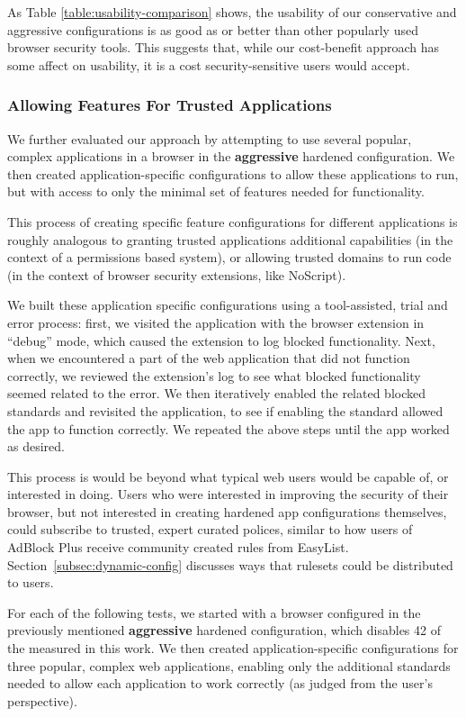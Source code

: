 As Table \ref{table:usability-comparison} shows, the usability of our
conservative and aggressive configurations is as good as or better than other
popularly used browser security tools.  This suggests that, while
our \WASs cost-benefit approach has some affect on usability, it is a
cost security-sensitive users would accept.


\subsubsection{Allowing Features For Trusted Applications}
We further evaluated our approach by attempting to use several popular,
complex \JS applications in a browser in the \textbf{aggressive} hardened
configuration.  We then created application-specific configurations to allow
these applications to run, but with access to only the minimal set of
features needed for functionality.

This process of creating specific feature configurations for different
applications is roughly analogous to granting trusted applications additional
capabilities (in the context of a permissions based system), or allowing trusted
domains to run \JS code (in the context of browser security extensions, like
NoScript).

We built these application specific configurations using a tool-assisted,
trial and error process: first, we visited the application with the browser
extension in ``debug'' mode,
which caused the extension to log blocked functionality.  Next,
when we encountered a part of the web application that did not function correctly,
we reviewed the extension's log to see what blocked functionality seemed
related to the error.  We then iteratively enabled the related blocked
standards and revisited the application, to see if enabling the standard
allowed the app to function correctly.  We repeated the above steps
until the app worked as desired.

This process is would be beyond what typical web users would be
capable of, or interested in doing.  Users who were interested in improving the
security of their browser, but not interested in creating hardened app
configurations themselves, could subscribe to trusted, expert curated polices,
similar to how users of AdBlock Plus receive community created rules from
EasyList.  Section~\ref{subsec:dynamic-config} discusses ways that rulesets
could be distributed to users.

For each of the following tests, we started with a browser configured in
the previously mentioned \textbf{aggressive} hardened configuration, 
which disables 42 of the \NumStandards \WASs measured in this work.  We then created
application-specific configurations for three popular, complex web applications,
enabling only the additional standards needed to allow each application
to work correctly (as judged from the user's perspective).

